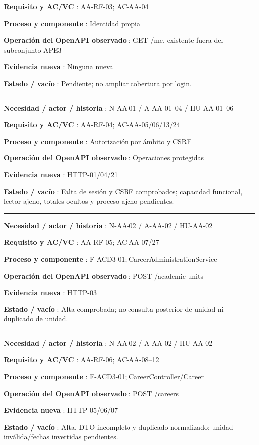 \documentclass[11pt,a4paper]{article}
\begin{document}
\textbf{Requisito y AC/VC }: AA-RF-03; AC-AA-04

\textbf{Proceso y componente }: Identidad propia

\textbf{Operación del OpenAPI observado }: GET /me, existente fuera del
subconjunto APE3

\textbf{Evidencia nueva }: Ninguna nueva

\textbf{Estado / vacío }: Pendiente; no ampliar cobertura por login.

\medskip\hrule\medskip

\textbf{Necesidad / actor / historia }: N-AA-01 / A-AA-01--04 /
HU-AA-01--06

\textbf{Requisito y AC/VC }: AA-RF-04; AC-AA-05/06/13/24

\textbf{Proceso y componente }: Autorización por ámbito y CSRF

\textbf{Operación del OpenAPI observado }: Operaciones protegidas

\textbf{Evidencia nueva }: HTTP-01/04/21

\textbf{Estado / vacío }: Falta de sesión y CSRF comprobados; capacidad
funcional, lector ajeno, totales ocultos y proceso ajeno pendientes.

\medskip\hrule\medskip

\textbf{Necesidad / actor / historia }: N-AA-02 / A-AA-02 / HU-AA-02

\textbf{Requisito y AC/VC }: AA-RF-05; AC-AA-07/27

\textbf{Proceso y componente }: F-ACD3-01; CareerAdministrationService

\textbf{Operación del OpenAPI observado }: POST /academic-units

\textbf{Evidencia nueva }: HTTP-03

\textbf{Estado / vacío }: Alta comprobada; no consulta posterior de
unidad ni duplicado de unidad.

\medskip\hrule\medskip

\textbf{Necesidad / actor / historia }: N-AA-02 / A-AA-02 / HU-AA-02

\textbf{Requisito y AC/VC }: AA-RF-06; AC-AA-08--12

\textbf{Proceso y componente }: F-ACD3-01; CareerController/Career

\textbf{Operación del OpenAPI observado }: POST /careers

\textbf{Evidencia nueva }: HTTP-05/06/07

\textbf{Estado / vacío }: Alta, DTO incompleto y duplicado normalizado;
unidad inválida/fechas invertidas pendientes.
\end{document}
